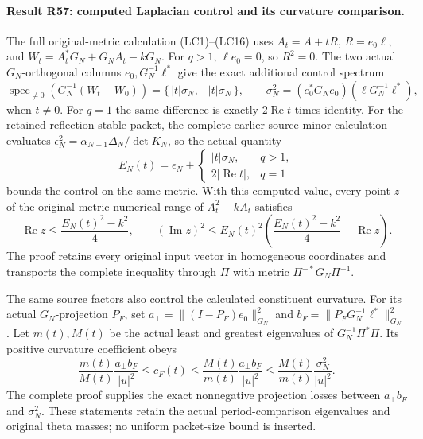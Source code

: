 \paragraph{Result R57: computed Laplacian control and its curvature comparison.}
The full original-metric calculation (LC1)--(LC16) uses
\(A_t=A+tR\), \(R=e_0\ell\), and
\(W_t=A_t^*G_N+G_NA_t-kG_N\).
For \(q>1\), \(\ell e_0=0\), so \(R^2=0\). The two actual
\(G_N\)-orthogonal columns \(e_0,G_N^{-1}\ell^*\) give
the exact additional control spectrum
\[
 \operatorname{spec}_{\ne0}
     (G_N^{-1}(W_t-W_0))
       =\{\,|t|\sigma_N,-|t|\sigma_N\,\},\qquad
 \sigma_N^2=(e_0^*G_Ne_0)(\ell G_N^{-1}\ell^*),
\]
when \(t\ne0\). For \(q=1\) the same difference is exactly
\(2\operatorname{Re}t\) times identity. For the retained
reflection-stable packet, the complete earlier source-minor calculation evaluates
\(\epsilon_N^2=\alpha_{N+1}\Delta_N/\det K_N\), so the actual
quantity
\[
 E_N(t)=\epsilon_N+
 \begin{cases}|t|\sigma_N,&q>1,\\
               2|\operatorname{Re}t|,&q=1
 \end{cases}
\]
bounds the control on the same metric. With this computed value,
every point \(z\) of the original-metric numerical range of
\(A_t^2-kA_t\) satisfies
\[
 \operatorname{Re}z\le\frac{E_N(t)^2-k^2}{4},\qquad
 (\operatorname{Im}z)^2\le E_N(t)^2
   \left(\frac{E_N(t)^2-k^2}{4}-\operatorname{Re}z\right).
\]
The proof retains every original input vector in homogeneous
coordinates and transports the complete inequality through
\(\Pi\) with metric \(\Pi^{-*}G_N\Pi^{-1}\).

The same source factors also control the calculated constituent
curvature. For its actual \(G_N\)-projection \(P_F\), set
\(a_\perp=\|(I-P_F)e_0\|_{G_N}^2\) and
\(b_F=\|P_FG_N^{-1}\ell^*\|_{G_N}^2\).
Let \(m(t),M(t)\) be the actual least and greatest eigenvalues of
\(G_N^{-1}\Pi^*\Pi\). Its positive curvature coefficient obeys
\[
 \frac{m(t)}{M(t)}\frac{a_\perp b_F}{|u|^2}
 \le c_F(t)\le
 \frac{M(t)}{m(t)}\frac{a_\perp b_F}{|u|^2}
 \le\frac{M(t)}{m(t)}\frac{\sigma_N^2}{|u|^2}.
\]
The complete proof supplies the exact nonnegative projection losses
between \(a_\perp b_F\) and \(\sigma_N^2\). These statements
retain the actual period-comparison eigenvalues and original theta
masses; no uniform packet-size bound is inserted.

